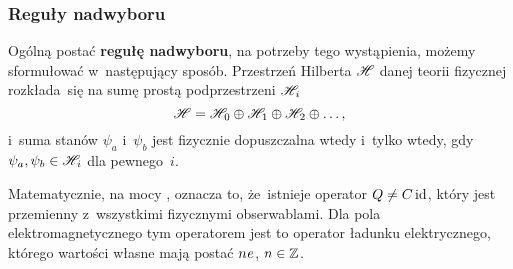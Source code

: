 \documentclass[10pt,t]{beamer}
\begin{document}
\begin{frame}
  \frametitle{Reguły nadwyboru}


  Ogólną postać \textbf{regułę nadwyboru}, na potrzeby tego wystąpienia,
  możemy sformułować w~następujący sposób. Przestrzeń Hilberta $\mathcal{H}$ danej
  teorii fizycznej rozkłada~się na sumę prostą podprzestrzeni
  $\mathcal{H}_{ \hspace{0.07em} i }$
  \begin{equation}
    \label{eq:Glowne-rodzaje-problemow-podczerwonych-03}
    \mathcal{H} =
    \mathcal{H}_{ \hspace{0.07em} 0 } \oplus \mathcal{H}_{ \hspace{0.07em} 1 } \oplus
    \mathcal{H}_{ \hspace{0.07em} 2 } \oplus \ldots,
  \end{equation}
  i~suma stanów $\psi_{ a }$ i~$\psi_{ b }$ jest \alert{fizycznie} dopuszczalna
  wtedy i~tylko wtedy, gdy $\psi_{ a }, \psi_{ b } \in \mathcal{H}_{ \hspace{0.07em} i }$
  dla pewnego~$i$.

  Matematycznie, na mocy
  ,
  oznacza to, że~istnieje operator $Q \neq C \operatorname{id}$, który jest przemienny
  z~wszystkimi fizycznymi obserwablami. Dla pola elektromagnetycznego tym
  operatorem jest to operator ładunku elektrycznego, którego wartości własne
  mają postać $n \hspace{0.05em} e$, $n \in \mathbb{Z}$.

\end{frame}
\end{document}
